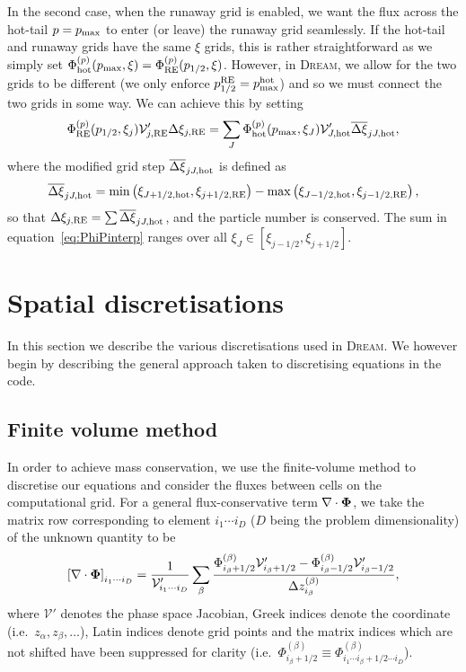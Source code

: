 \documentclass{notes}
\newcommand{\DREAM}{\textsc{Dream}}
\newcommand{\Vp}{\mathcal{V}'}
\begin{document}
    In the second case, when the runaway grid is enabled, we want the flux
    across the hot-tail $p=p_{\rm max}$ to enter (or leave) the runaway grid
    seamlessly. If the hot-tail and runaway grids have the same $\xi$ grids,
    this is rather straightforward as we simply set 
    $\Phi^{(p)}_{\rm hot}(p_{\rm max},\xi) = \Phi^{(p)}_{\rm RE}(p_{1/2},\xi)$.
    However, in \DREAM, we allow for the two grids to be different (we only
    enforce $p^{\rm RE}_{1/2} = p^{\rm hot}_{\rm max}$) and so we must connect
    the two grids in some way. We can achieve this by setting
    \begin{equation}
        \Phi^{(p)}_{\rm RE}(p_{1/2},\xi_j)\Vp_{j,\rm RE}\Delta\xi_{j,\rm RE} =
        \sum_{J} \Phi^{(p)}_{\rm hot}(p_{\rm max},\xi_J) \Vp_{J,\rm hot} \overline{\Delta\xi}_{jJ,\rm hot},
    \end{equation}
    where the modified grid step $\overline{\Delta\xi}_{jJ,\rm hot}$ is defined
    as
    \begin{equation}\label{eq:PhiPinterp}
        \overline{\Delta\xi}_{jJ,\rm hot} = \min\left(\xi_{J+1/2,{\rm hot}},\xi_{j+1/2,{\rm RE}}\right) -
        \max\left( \xi_{J-1/2,{\rm hot}}, \xi_{j-1/2,{\rm RE}} \right),
    \end{equation}
    so that $\Delta\xi_{j,\rm RE} = \sum\overline{\Delta\xi}_{jJ,\rm hot}$, and
    the particle number is conserved. The sum in equation~\eqref{eq:PhiPinterp}
    ranges over all $\xi_J\in [\xi_{j-1/2},\xi_{j+1/2}]$.

    \section{Spatial discretisations}
    In this section we describe the various discretisations used in \DREAM. We
    however begin by describing the general approach taken to discretising
    equations in the code.

    \subsection{Finite volume method}
    In order to achieve mass conservation, we use the finite-volume method to
    discretise our equations and consider the fluxes between cells on the
    computational grid. For a general flux-conservative term
    $\nabla\cdot\boldsymbol{\Phi}$, we take the matrix row corresponding to element
    $i_1\cdots i_D$ ($D$ being the problem dimensionality) of the unknown
    quantity to be
    \begin{equation}
        \left[ \nabla\cdot\bb{\Phi} \right]_{i_1\cdots i_D}  =
            \frac{1}{\Vp_{i_1\cdots i_D}}\sum_\beta \frac{
                \Phi^{(\beta)}_{i_\beta+1/2} \Vp_{i_\beta+1/2} -
                \Phi^{(\beta)}_{i_\beta-1/2} \Vp_{i_\beta-1/2}
            }{\Delta z^{(\beta)}_{i_\beta}},
    \end{equation}
    where $\Vp$ denotes the phase space Jacobian, Greek indices denote the
    coordinate (i.e.\ $z_\alpha, z_\beta, \ldots$), Latin indices denote grid
    points and the matrix indices which are not shifted have been suppressed for
    clarity (i.e.\
    $\Phi^{(\beta)}_{i_\beta+1/2}\equiv\Phi^{(\beta)}_{i_1\cdots i_\beta+1/2\cdots i_D}$).
\end{document}
